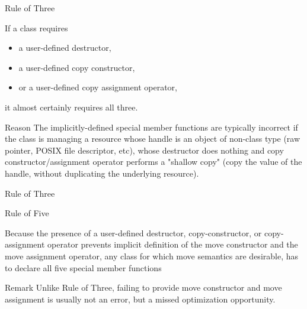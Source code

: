 \begin{frame}{Rule of Three}{}
  \begin{definition}
    If a class requires
    \begin{itemize}
    \item
      a user-defined destructor,
    \item
      a user-defined copy constructor,
    \item
      or a user-defined copy assignment operator,
    \end{itemize}
    it almost certainly requires all three.
  \end{definition}

  \begin{block}{Reason}
    The implicitly-defined special member functions are typically incorrect if the class is managing a resource whose handle is an object of non-class type (raw pointer, POSIX file descriptor, etc), whose destructor does nothing and copy constructor/assignment operator performs a "shallow copy" (copy the value of the handle, without duplicating the underlying resource).
  \end{block}
\end{frame}

\begin{frame}{Rule of Three}{}
  \begin{example}
  \end{example}
\end{frame}

\begin{frame}{Rule of Five}{}
  \begin{definition}
    Because the presence of a user-defined destructor, copy-constructor, or copy-assignment operator prevents implicit definition of the move constructor and the move assignment operator, any class for which move semantics are desirable, has to declare all five special member functions
  \end{definition}

  \begin{block}{Remark}
    Unlike Rule of Three, failing to provide move constructor and move assignment is usually not an error, but a missed optimization opportunity.
  \end{block}
\end{frame}

